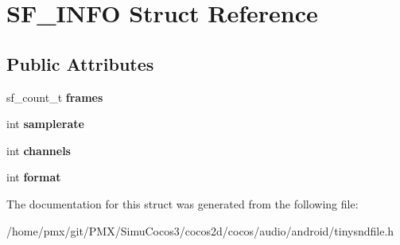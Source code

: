\hypertarget{structSF__INFO}{}\section{S\+F\+\_\+\+I\+N\+FO Struct Reference}
\label{structSF__INFO}
\subsection*{Public Attributes}
\begin{DoxyCompactItemize}
\item 
\mbox{\label{structSF__INFO_a80838e7063ecc3d8d7ff9f92ab1efdfb}} 
sf\+\_\+count\+\_\+t {\bfseries frames}
\item 
\mbox{\label{structSF__INFO_acfd248e20ab1c58b57aafc7b16404a5f}} 
int {\bfseries samplerate}
\item 
\mbox{\label{structSF__INFO_aad5220b31d2672bf83d3cf4cea0b2826}} 
int {\bfseries channels}
\item 
\mbox{\label{structSF__INFO_a36a7c3ae9a8229797f19267b4ba07361}} 
int {\bfseries format}
\end{DoxyCompactItemize}


The documentation for this struct was generated from the following file\+:\begin{DoxyCompactItemize}
\item 
/home/pmx/git/\+P\+M\+X/\+Simu\+Cocos3/cocos2d/cocos/audio/android/tinysndfile.\+h\end{DoxyCompactItemize}

